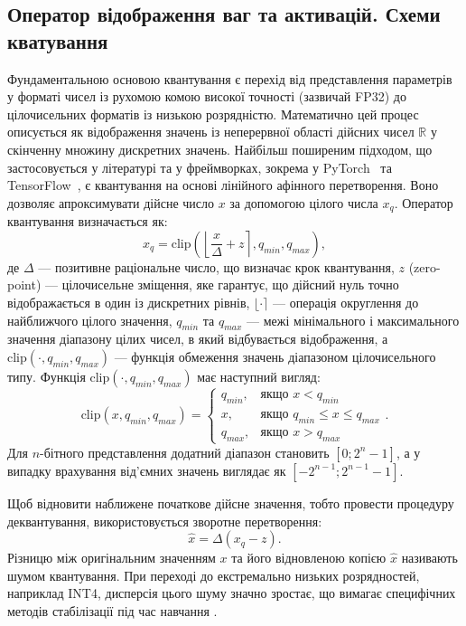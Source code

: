 \documentclass{pma-mthesis}
\begin{document}
\subsection{Оператор відображення ваг та активацій. Схеми кватування}
Фундаментальною основою квантування є перехід від представлення параметрів у форматі чисел із рухомою комою високої точності (зазвичай FP32) до цілочисельних форматів із низькою розрядністю. Математично цей процес описується як відображення значень із неперервної області дійсних чисел $\mathbb{R}$ у скінченну множину дискретних значень. Найбільш поширеним підходом, що застосовується у літературі та у фреймворках, зокрема у PyTorch~\cite{Ansel_PyTorch_2_Faster_2024} та TensorFlow~\cite{abadi2016tensorflow}, є квантування на основі лінійного афінного перетворення. Воно дозволяє апроксимувати дійсне число $x$ за допомогою цілого числа $x_q$. Оператор квантування визначається як:
\begin{equation}
    x_q = \text{clip}\left(\left\lfloor \frac{x}{\Delta} + z \right\rceil, q_{min}, q_{max}\right),
\end{equation}
де $\Delta$ --- позитивне раціональне число, що визначає крок квантування, $z$ (zero-point) --- цілочисельне зміщення, яке гарантує, що дійсний нуль точно відображається в один із дискретних рівнів, $\lfloor \cdot \rceil$ --- операція округлення до найближчого цілого значення, $q_{min}$ та $q_{max}$ --- межі мінімального і максимального значення діапазону цілих чисел, в який відбувається відображення, а $\text{clip}(\cdot, q_{min}, q_{max})$ --- функція обмеження значень діапазоном цілочисельного типу. Функція $\text{clip}(\cdot, q_{min}, q_{max})$ має наступний вигляд:
\begin{equation}
    \text{clip}(x, q_{min}, q_{max}) = \begin{cases} q_{min}, & \text{якщо } x < q_{min} \\ x, & \text{якщо } q_{min} \leq x \leq q_{max} \\ q_{max}, & \text{якщо } x > q_{max} \end{cases}.
\end{equation}
Для $n$-бітного представлення додатний діапазон становить $[0; 2^n - 1]$, а у випадку врахування від'ємних значень виглядає як $[-2^{n-1}; 2^{n-1} - 1]$.

Щоб відновити наближене початкове дійсне значення, тобто провести процедуру деквантування, використовується зворотне перетворення:
\begin{equation}
    \hat{x} = \Delta (x_q - z).
\end{equation}
Різницю між оригінальним значенням $x$ та його відновленою копією $\hat{x}$ називають шумом квантування. При переході до екстремально низьких розрядностей, наприклад INT4, дисперсія цього шуму значно зростає, що вимагає специфічних методів стабілізації під час навчання \cite{krishnamoorthi2018quantizing}.
\end{document}
